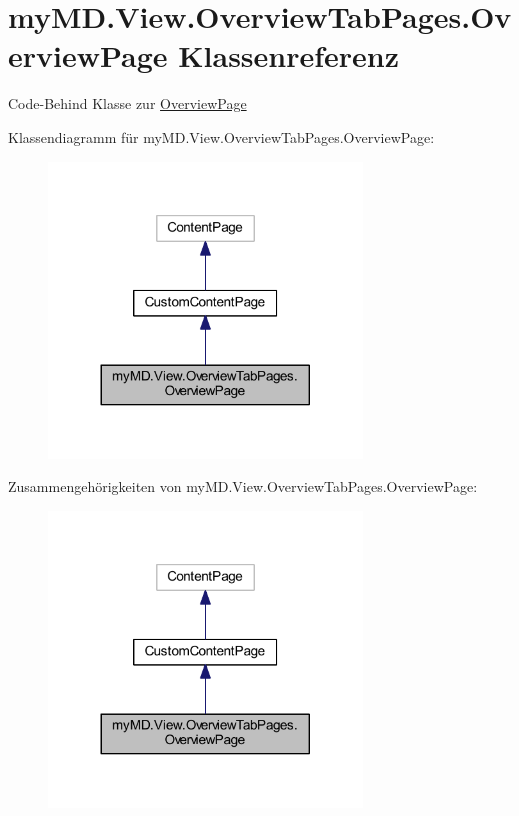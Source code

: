 \hypertarget{classmy_m_d_1_1_view_1_1_overview_tab_pages_1_1_overview_page}{}\section{my\+M\+D.\+View.\+Overview\+Tab\+Pages.\+Overview\+Page Klassenreferenz}
\label{classmy_m_d_1_1_view_1_1_overview_tab_pages_1_1_overview_page}


Code-\/\+Behind Klasse zur \mbox{\hyperlink{classmy_m_d_1_1_view_1_1_overview_tab_pages_1_1_overview_page}{Overview\+Page}}  




Klassendiagramm für my\+M\+D.\+View.\+Overview\+Tab\+Pages.\+Overview\+Page\+:
\nopagebreak
\begin{figure}[H]
\begin{center}
\leavevmode
\includegraphics[width=236pt]{classmy_m_d_1_1_view_1_1_overview_tab_pages_1_1_overview_page__inherit__graph}
\end{center}
\end{figure}


Zusammengehörigkeiten von my\+M\+D.\+View.\+Overview\+Tab\+Pages.\+Overview\+Page\+:
\nopagebreak
\begin{figure}[H]
\begin{center}
\leavevmode
\includegraphics[width=236pt]{classmy_m_d_1_1_view_1_1_overview_tab_pages_1_1_overview_page__coll__graph}
\end{center}
\end{figure}
